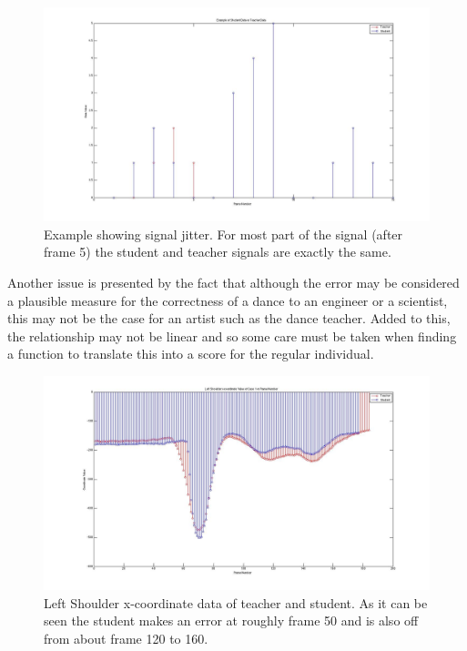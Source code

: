 \documentclass[11pt,a4paper]{article}
\begin{document}
\begin{figure}[H]
\centering
\includegraphics[scale=0.2]{Jitter_Example.jpg}
\caption{Example showing signal jitter. For most part of the signal (after frame 5) the student and teacher signals are exactly the same.}
\label{jitter}
\end{figure}

\noindent
Another issue is presented by the fact that although the error may be considered a plausible measure for the correctness of a dance to an engineer or a scientist, this may not be the case for an artist such as the dance teacher. Added to this, the relationship may not be linear and so some care must be taken when finding a function to translate this into a score for the regular individual.

\begin{figure}[H]
\centering
\includegraphics[scale=0.2]{Data_Analysis_LS_Correct.jpg}
\caption{Left Shoulder x-coordinate data of teacher and student. As it can be seen the student makes an error at roughly frame 50 and is also off from about frame 120 to 160.}
\label{error_left_shoulder}
\end{figure}
\end{document}
